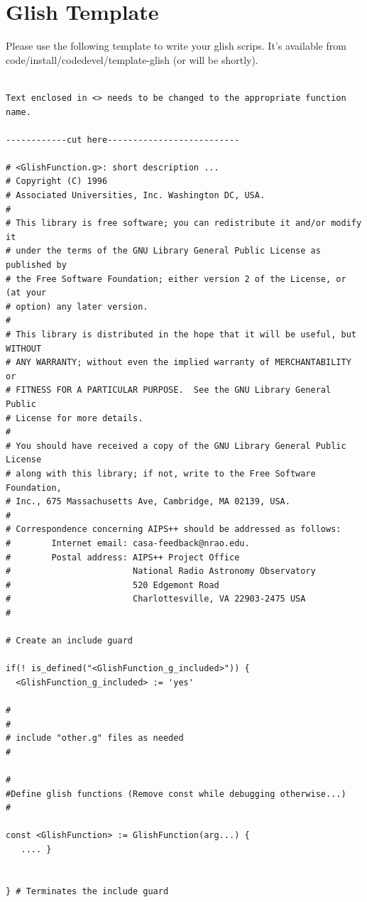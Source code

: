 \section{Glish Template}
Please use the following template to write your glish scrips.  It's available
from code/install/codedevel/template-glish (or will be shortly).
\begin{verbatim}

Text enclosed in <> needs to be changed to the appropriate function name.

------------cut here--------------------------

# <GlishFunction.g>: short description ...
# Copyright (C) 1996
# Associated Universities, Inc. Washington DC, USA.
#
# This library is free software; you can redistribute it and/or modify it
# under the terms of the GNU Library General Public License as published by
# the Free Software Foundation; either version 2 of the License, or (at your
# option) any later version.
#
# This library is distributed in the hope that it will be useful, but WITHOUT
# ANY WARRANTY; without even the implied warranty of MERCHANTABILITY or
# FITNESS FOR A PARTICULAR PURPOSE.  See the GNU Library General Public
# License for more details.
#
# You should have received a copy of the GNU Library General Public License
# along with this library; if not, write to the Free Software Foundation,
# Inc., 675 Massachusetts Ave, Cambridge, MA 02139, USA.
#
# Correspondence concerning AIPS++ should be addressed as follows:
#        Internet email: casa-feedback@nrao.edu.
#        Postal address: AIPS++ Project Office
#                        National Radio Astronomy Observatory
#                        520 Edgemont Road
#                        Charlottesville, VA 22903-2475 USA
#

# Create an include guard

if(! is_defined("<GlishFunction_g_included>")) {
  <GlishFunction_g_included> := 'yes'

#
#
# include "other.g" files as needed
#

#
#Define glish functions (Remove const while debugging otherwise...)
#

const <GlishFunction> := GlishFunction(arg...) {  
   .... }


} # Terminates the include guard


\end{verbatim}
